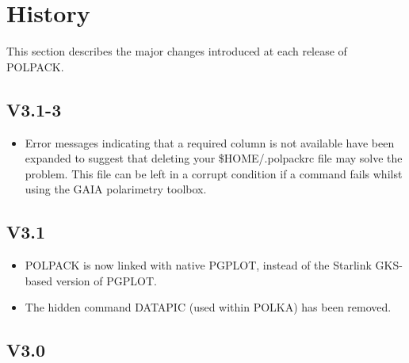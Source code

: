 \documentclass[twoside,11pt]{article}
\renewcommand{\_}{\texttt{\symbol{95}}}
\begin{document}
\section{\label{APP:HISTORY}History}
This section describes the major changes introduced at each release of
POLPACK.

\subsection{V3.1-3}

\begin{itemize}
 \item Error messages indicating that a required column is not available
 have been expanded to suggest that deleting your \$HOME/.polpackrc
 file may solve the problem. This file can be left in a corrupt condition
 if a command fails whilst using the GAIA polarimetry toolbox. 

\end{itemize}

\subsection{V3.1}

\begin{itemize}
\item POLPACK is now linked with native PGPLOT, instead of the Starlink
GKS-based version of PGPLOT.

\item The hidden command DATAPIC (used within POLKA) has been removed.

\end{itemize}

\subsection{V3.0}
\end{document}
